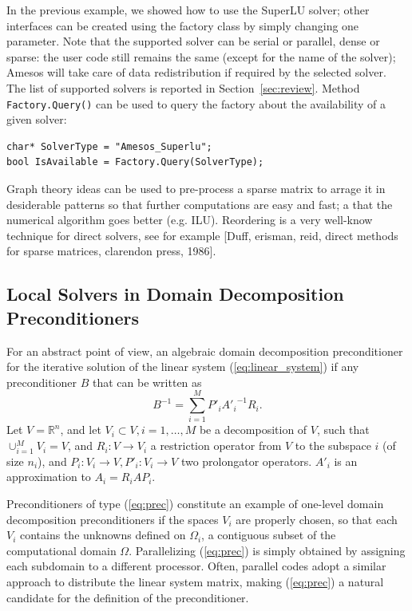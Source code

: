 \documentclass[acmtocl]{acmtrans2m}
\begin{document}
In the previous example, we showed how to use the SuperLU solver; other
interfaces
can be created using the factory class by simply changing one parameter. Note
that the supported solver can be serial or parallel, dense or sparse: the user
code still remains the same (except for the name of the solver); Amesos will
take care of data redistribution if required by the selected solver. The list
of supported solvers is reported in Section~\ref{sec:review}.
 Method
\verb!Factory.Query()! can be used to query the factory about the
availability of a given solver:
\begin{verbatim}
char* SolverType = "Amesos_Superlu";
bool IsAvailable = Factory.Query(SolverType);
\end{verbatim}

\bigskip

Graph theory ideas can be used to pre-process a sparse matrix to arrage it in
desiderable patterns so that further computations are easy and fast; a that
the numerical algorithm goes better (e.g. ILU). Reordering is a very well-know
technique for direct solvers, see for example [Duff, erisman, reid, direct
methods for sparse matrices, clarendon press, 1986].

\subsection{Local Solvers in Domain Decomposition Preconditioners}
\label{sec:ifpack}

For an abstract point of view, an algebraic domain decomposition
preconditioner for the iterative solution of the linear system
(\ref{eq:linear_system})
if any preconditioner $B$ that can be written as
\begin{equation}
\label{eq:prec}
B^{-1} = \sum_{i=1}^M P'_i {A'_i}^{-1} R_i.
\end{equation}
Let $V = \mathbb{R}^n$, and
let $V_i \subset V, i = 1, \ldots, M$ be a decomposition of $V$, such that
$\cup_{i=1}^M V_i = V$, and $R_i: V \rightarrow V_i$ a restriction operator
from $V$ to the subspace $i$ (of size $n_i$),
and $P_i: V_i \rightarrow V, P'_i : V_i \rightarrow V$ two prolongator
operators. $A'_i$ is an approximation to $A_i = R_i A P_i$. 

Preconditioners of type (\ref{eq:prec}) constitute an example of one-level
domain decomposition preconditioners if the spaces $V_i$ are properly chosen,
so that each $V_i$ contains the unknowns defined on $\Omega_i$, a contiguous
subset of the computational domain $\Omega$. Parallelizing (\ref{eq:prec})
is simply obtained by assigning each subdomain to a different processor.
Often, parallel codes adopt a similar approach to distribute the linear
system matrix, making (\ref{eq:prec}) a natural candidate for the definition
of the preconditioner.
\end{document}
